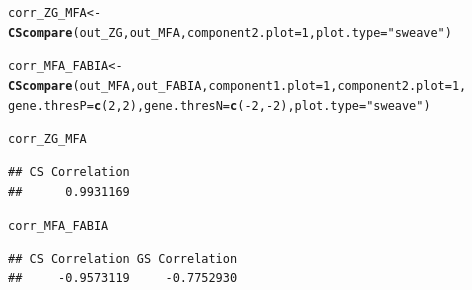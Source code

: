 \documentclass[a4paper]{article}\usepackage[]{graphicx}\usepackage[]{color}
\makeatletter
\newcommand{\hlnum}[1]{\textcolor[rgb]{0.686,0.059,0.569}{#1}}%
\newcommand{\hlstr}[1]{\textcolor[rgb]{0.192,0.494,0.8}{#1}}%
\newcommand{\hlopt}[1]{\textcolor[rgb]{0,0,0}{#1}}%
\newcommand{\hlstd}[1]{\textcolor[rgb]{0.345,0.345,0.345}{#1}}%
\newcommand{\hlkwb}[1]{\textcolor[rgb]{0.69,0.353,0.396}{#1}}%
\newcommand{\hlkwc}[1]{\textcolor[rgb]{0.333,0.667,0.333}{#1}}%
\newcommand{\hlkwd}[1]{\textcolor[rgb]{0.737,0.353,0.396}{\textbf{#1}}}%
\newenvironment{kframe}{%
 \def\at@end@of@kframe{}%
 \ifinner\ifhmode%
  \def\at@end@of@kframe{\end{minipage}}%
  \begin{minipage}{\columnwidth}%
 \fi\fi%
 \def\FrameCommand##1{\hskip\@totalleftmargin \hskip-\fboxsep
 \colorbox{shadecolor}{##1}\hskip-\fboxsep
     \hskip-\linewidth \hskip-\@totalleftmargin \hskip\columnwidth}%
 \MakeFramed {\advance\hsize-\width
   \@totalleftmargin\z@ \linewidth\hsize
   \@setminipage}}%
 {\par\unskip\endMakeFramed%
 \at@end@of@kframe}
\newenvironment{knitrout}{}{} %
\makeatother
\begin{document}
\begin{knitrout}
\color{fgcolor}\begin{kframe}
\begin{alltt}
        \hlstd{corr_ZG_MFA} \hlkwb{<-} \hlkwd{CScompare}\hlstd{(out_ZG,out_MFA,}\hlkwc{component2.plot}\hlstd{=}\hlnum{1}\hlstd{,}\hlkwc{plot.type}\hlstd{=}\hlstr{"sweave"}\hlstd{)}

        \hlstd{corr_MFA_FABIA} \hlkwb{<-} \hlkwd{CScompare}\hlstd{(out_MFA,out_FABIA,}\hlkwc{component1.plot}\hlstd{=}\hlnum{1}\hlstd{,}\hlkwc{component2.plot}\hlstd{=}\hlnum{1}\hlstd{,}
                        \hlkwc{gene.thresP}\hlstd{=}\hlkwd{c}\hlstd{(}\hlnum{2}\hlstd{,}\hlnum{2}\hlstd{),}\hlkwc{gene.thresN}\hlstd{=}\hlkwd{c}\hlstd{(}\hlopt{-}\hlnum{2}\hlstd{,}\hlopt{-}\hlnum{2}\hlstd{),}\hlkwc{plot.type}\hlstd{=}\hlstr{"sweave"}\hlstd{)}

        \hlstd{corr_ZG_MFA}
\end{alltt}
\begin{verbatim}
## CS Correlation 
##      0.9931169
\end{verbatim}
\begin{alltt}
        \hlstd{corr_MFA_FABIA}
\end{alltt}
\begin{verbatim}
## CS Correlation GS Correlation 
##     -0.9573119     -0.7752930
\end{verbatim}
\end{kframe}\begin{figure}[H]



\end{figure}
\end{knitrout}
\end{document}
